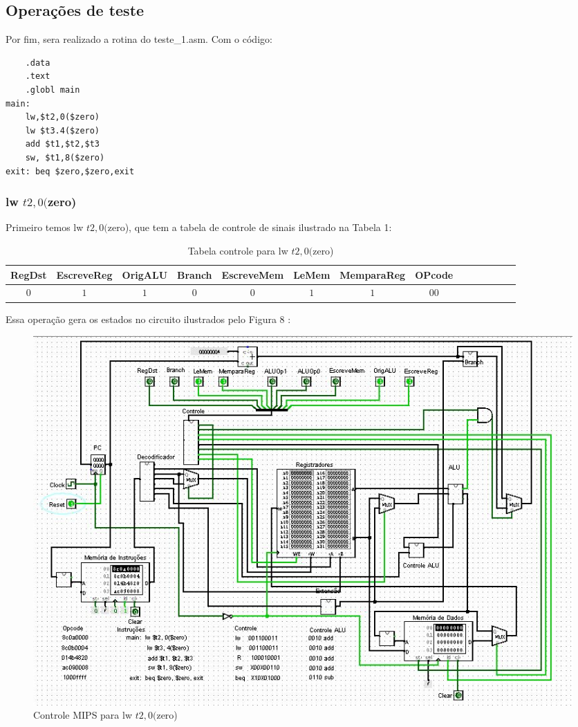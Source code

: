 \documentclass[
	article,
	11pt,
	oneside,
	a4paper,
	english,
	brazil,
	]{abntex2}
\begin{document}
\subsection{Operações de teste}
Por fim, sera realizado a rotina do teste_1.asm. Com o código: 

\begin{lstlisting}
    .data
    .text
    .globl main
main:
    lw,$t2,0($zero)
    lw $t3.4($zero)
    add $t1,$t2,$t3
    sw, $t1,8($zero)
exit: beq $zero,$zero,exit
\end{lstlisting}


\subsubsection{lw $t2,0($zero)}
Primeiro temos lw $t2,0($zero), que tem a tabela de controle de sinais ilustrado na Tabela 1:

\begin{table}[h!]
  \centering
  \begin{adjustbox}{max width=\textwidth}
  \begin{tabular}{*{14}{|c}|}%
  \hline
  RegDst & EscreveReg &OrigALU & Branch & EscreveMem & LeMem & MemparaReg & OPcode\\
  \hline
  \hline
  $0$ & $1$ & $1$ & $0$ & $0$ & $1$ & $1$ &
  $00$ \\
  \hline
\end{tabular}
\end{adjustbox}
  \caption{Tabela controle para lw $t2,0($zero)}
  \label{tab:label_test}
\end{table}

Essa operação gera os estados no circuito ilustrados pelo Figura 8 : 

        \begin{figure}[!htb]
        \centering
        \includegraphics[scale=0.5]{imagens/teste_1.JPG}
        \caption{Controle MIPS para lw $t2,0($zero)}
        \label{fig:hostnetid}
        \end{figure}
\end{document}

